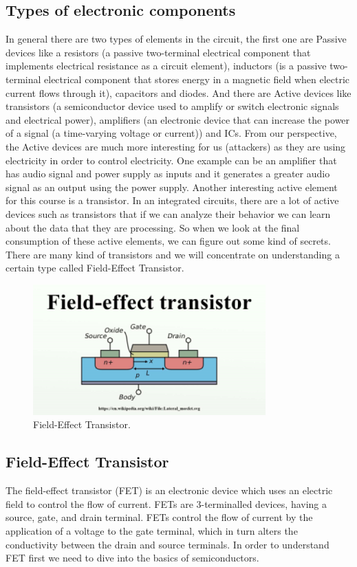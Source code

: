 \subsection{Types of electronic components}
In general there are two types of elements in the circuit, the first one are Passive devices like a resistors (a passive two-terminal electrical component that implements electrical resistance as a circuit element), inductors (is a passive two-terminal electrical component that stores energy in a magnetic field when electric current flows through it), capacitors and diodes. And there are Active devices like transistors (a semiconductor device used to amplify or switch electronic signals and electrical power), amplifiers (an electronic device that can increase the power of a signal (a time-varying voltage or current)) and ICs. From our perspective, the Active devices are much more interesting for us (attackers) as they are using electricity in order to control electricity. One example can be an amplifier that has audio signal and power supply as inputs and it generates a greater audio signal as an output using the power supply. 
Another interesting active element for this course is a transistor. In an integrated circuits, there are a lot of active devices such as transistors  that if we can analyze their behavior we can learn about the data that they are processing. So when we look at the final consumption of these active elements, we can figure out some kind of secrets.
There are many kind of transistors and we will concentrate on understanding a certain type called Field-Effect Transistor.
\begin{figure}[h]
	\centering
	\includegraphics{images/field_effect_transistor.png}
	\caption{Field-Effect Transistor.} \label{field_effect_transistor:fig}
\end{figure}
\subsection{ Field-Effect Transistor }
The field-effect transistor (FET) is an electronic device which uses an electric field to control the flow of current. FETs are 3-terminalled devices, having a source, gate, and drain terminal. FETs control the flow of current by the application of a voltage to the gate terminal, which in turn alters the conductivity between the drain and source terminals.
In order to understand FET first we need to dive into the basics of semiconductors.
